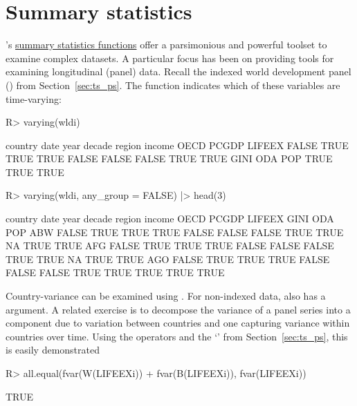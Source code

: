 \documentclass[article]{jss}
\newcommand{\class}[1]{`\code{#1}'}
\newcommand{\fct}[1]{\code{#1()}}
\begin{document}
\section{Summary statistics} \label{sec:summ_stat}
%
's \href{https://sebkrantz.github.io/collapse/reference/summary-statistics.html}{summary statistics functions} offer a parsimonious and powerful toolset to examine complex datasets. A particular focus has been on providing tools for examining longitudinal (panel) data. Recall the indexed world development panel () from Section~\ref{sec:ts_ps}. The function \fct{varying} indicates which of these variables are time-varying:
%
\begin{Schunk}
\begin{Sinput}
R> varying(wldi)
\end{Sinput}
\begin{Soutput}
country    date    year  decade  region  income    OECD   PCGDP  LIFEEX 
  FALSE    TRUE    TRUE    TRUE   FALSE   FALSE   FALSE    TRUE    TRUE 
   GINI     ODA     POP 
   TRUE    TRUE    TRUE 
\end{Soutput}
\begin{Sinput}
R> varying(wldi, any_group = FALSE) |> head(3)
\end{Sinput}
\begin{Soutput}
    country date year decade region income  OECD PCGDP LIFEEX GINI  ODA  POP
ABW   FALSE TRUE TRUE   TRUE  FALSE  FALSE FALSE  TRUE   TRUE   NA TRUE TRUE
AFG   FALSE TRUE TRUE   TRUE  FALSE  FALSE FALSE  TRUE   TRUE   NA TRUE TRUE
AGO   FALSE TRUE TRUE   TRUE  FALSE  FALSE FALSE  TRUE   TRUE TRUE TRUE TRUE
\end{Soutput}
\end{Schunk}
%
Country-variance can be examined using . For non-indexed data, \fct{varying} also has a  argument. A related exercise is to decompose the variance of a panel series into a component due to variation between countries and one capturing variance within countries over time. Using the  operators and the  \class{indexed\_series} from Section~\ref{sec:ts_ps}, this is easily demonstrated
%
\begin{Schunk}
\begin{Sinput}
R> all.equal(fvar(W(LIFEEXi)) + fvar(B(LIFEEXi)), fvar(LIFEEXi))
\end{Sinput}
\begin{Soutput}
[1] TRUE
\end{Soutput}
\end{Schunk}
\end{document}
